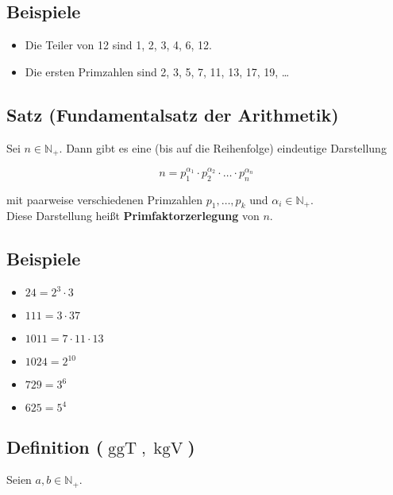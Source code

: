 \subsection{Beispiele}

	\begin{itemize}
		
		\item Die Teiler von 12 sind 1, 2, 3, 4, 6, 12.
		\item Die ersten Primzahlen sind 2, 3, 5, 7, 11, 13, 17, 19, \dots
		
	\end{itemize}
	
	
\subsection[Fundamentalsatz der Arithmetik]{Satz (Fundamentalsatz der Arithmetik)}

	Sei $n\in\mathbb{N_+}$. Dann gibt es eine (bis auf die Reihenfolge)
	eindeutige Darstellung
	
	\[
		n=p_1^{\alpha_1}\cdot p_2^{\alpha_2}\cdot\ldots\cdot p_n^{\alpha_n}
	\]
	
	mit paarweise verschiedenen Primzahlen $p_1,\dots,p_k$ und $\alpha_i\in\mathbb{N_+}$.\\
	Diese Darstellung heißt \textbf{Primfaktorzerlegung} von $n$.

	
\subsection{Beispiele}

	\begin{itemize}
	
		\item $24=2^3\cdot 3$
		\item $111=3\cdot 37$
		\item $1011=7\cdot 11\cdot 13$
		\item $1024=2^{10}$
		\item $729=3^6$
		\item $625=5^4$
	
	\end{itemize}
	
	
\subsection[$\operatorname{ggT}, \operatorname{kgV}$]{Definition ($\operatorname{ggT}, \operatorname{kgV}$)}
	
	Seien $a,b\in\mathbb{N_+}$.
	
